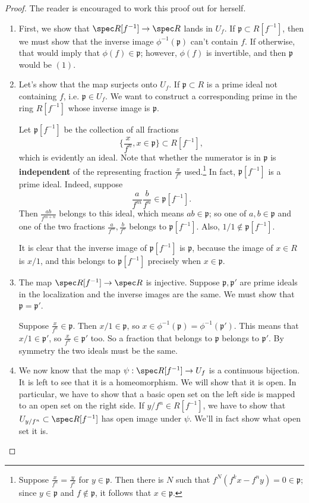 \begin{proof}
The reader is encouraged to work this proof out for herself.

\begin{enumerate}
\item 
First, we show that $\spec R[f^{-1}] \to \spec R$ lands in
$U_f$. If
$\mathfrak{p} \subset R[f^{-1}]$, then we must show that the
inverse image
$\phi^{-1}(\mathfrak{p})$ can't contain $f$. If otherwise, that
would imply that
$\phi(f) \in \mathfrak{p}$; however, $\phi(f)$ is invertible,
and then
$\mathfrak{p}$ would be $(1)$.  
\item Let's show that the map surjects onto $U_f$. If
$\mathfrak{p} \subset R$ is a prime
ideal not containing $f$, i.e. $\mathfrak{p} \in U_f$. We want
to construct a
corresponding prime in the ring $R[f^{-1}]$ whose inverse image
is $\mathfrak{p}$.

Let $\mathfrak{p}[f^{-1}]$ be the collection of all fractions
\[ \{\frac{x}{f^n}, x \in \mathfrak{p}\} \subset R[f^{-1}],  \]
which is evidently an ideal. Note that whether the numerator is
in
$\mathfrak{p}$ is \textbf{independent} of the
representing fraction $\frac{x}{f^n}$ used.\footnote{Suppose
$\frac{x}{f^n} =
\frac{y}{f^k}$ for $y \in \mathfrak{p}$. Then there is $N$ such
that
$f^N(f^k x - f^n y) = 0 \in \mathfrak{p}$; since $y \in
\mathfrak{p}$ and $f
\notin \mathfrak{p}$, it follows that $x \in \mathfrak{p}$.}
In fact, $\mathfrak{p}[f^{-1}]$ is a prime ideal. Indeed,
suppose
\[  \frac{a}{f^m} \frac{b}{f^n} \in \mathfrak{p}[f^{-1}] .\]
Then $\frac{ab}{f^{m+n}}$ belongs to this ideal, which means $ab
\in
\mathfrak{p}$; so one of $a,b \in \mathfrak{p}$ and one of the
two fractions
$\frac{a}{f^m}, \frac{b}{f^n}$ belongs to
$\mathfrak{p}[f^{-1}]$. Also, $1/1
\notin \mathfrak{p}[f^{-1}]$.

It is clear that the inverse image of $\mathfrak{p}[f^{-1}]$ is
$\mathfrak{p}$,
because the image of $x \in R$ is $x/1$, and this belongs to
$\mathfrak{p}[f^{-1}]$ precisely when $x \in \mathfrak{p}$.
\item The map $\spec R[f^{-1}] \to \spec R$ is injective.
Suppose
$\mathfrak{p}, \mathfrak{p'}$ are prime ideals in the
localization and the
inverse images are the same.  
We must show that $\mathfrak{p} = \mathfrak{p'}$.

Suppose $\frac{x}{f^n} \in \mathfrak{p}$. Then $x/1 \in
\mathfrak{p}$, so $x
\in \phi^{-1}(\mathfrak{p}) = \phi^{-1}(\mathfrak{p}')$. This
means that $x/1
\in \mathfrak{p}'$, so 
$\frac{x}{f^n} \in \mathfrak{p}'$ too. So a fraction that
belongs to
$\mathfrak{p}$ belongs to $\mathfrak{p}'$. By symmetry the two
ideals must be
the same.  
\item We now know that the map $\psi: \spec R[f^{-1}] \to U_f$
is a continuous
bijection. It is left to see that it is a homeomorphism. We will
show that it
is open.  
In particular, we have to show that a basic open set on the left
side is mapped
to an open set on the right side.
If $y/f^n \in R[f^{-1}]$, we have to show that $U_{y/f^n}
\subset \spec
R[f^{-1}]$ has open image under $\psi$. We'll in fact show what
open set it is.


\end{enumerate}
\end{proof}

